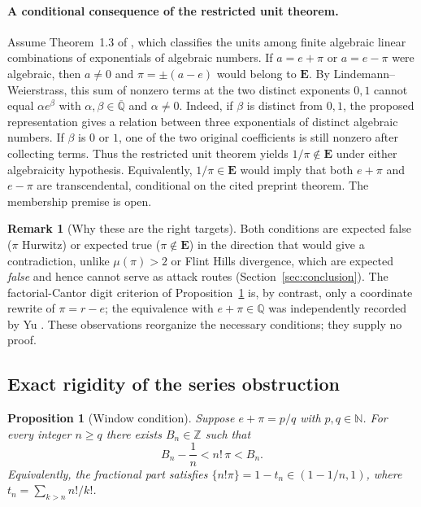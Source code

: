 \documentclass[11pt]{amsart}
\newtheorem{proposition}[theorem]{Proposition}
\theoremstyle{definition}
\newtheorem{remark}[theorem]{Remark}
\theoremstyle{remark}
\numberwithin{equation}{section}
\newcommand{\Q}{\mathbb{Q}}
\newcommand{\Z}{\mathbb{Z}}
\newcommand{\N}{\mathbb{N}}
\newcommand{\Qbar}{\overline{\mathbb{Q}}}
\newcommand{\irr}{\mu}
\begin{document}
\paragraph{A conditional consequence of the restricted unit theorem.}
Assume Theorem~1.3 of \cite{FischlerRivoal2026}, which classifies the
units among finite algebraic linear combinations of exponentials of
algebraic numbers. If $a=e+\pi$ or $a=e-\pi$ were algebraic, then $a\ne0$
and $\pi=\pm(a-e)$ would belong to $\mathbf E$. By
Lindemann--Weierstrass, this sum of nonzero terms at the two distinct
exponents $0,1$ cannot equal $\alpha e^\beta$ with
$\alpha,\beta\in\Qbar$ and $\alpha\ne0$. Indeed, if $\beta$ is distinct
from $0,1$, the proposed representation gives a relation between three
exponentials of distinct algebraic numbers. If $\beta$ is $0$ or $1$,
one of the two original coefficients is still nonzero after collecting
terms. Thus the restricted unit theorem yields $1/\pi\notin\mathbf E$
under either algebraicity hypothesis. Equivalently, $1/\pi\in\mathbf E$
would imply that both $e+\pi$ and $e-\pi$ are transcendental, conditional
on the cited preprint theorem. The membership premise is open.

\begin{remark}[Why these are the right targets]
Both conditions are expected false ($\pi$ Hurwitz) or expected true ($\pi\notin\mathbf{E}$) in the direction that would give a contradiction, unlike $\irr(\pi)>2$ or Flint Hills divergence, which are expected \emph{false} and hence cannot serve as attack routes (Section~\ref{sec:conclusion}). The factorial-Cantor digit criterion of Proposition~\ref{prop:window} is, by contrast, only a coordinate rewrite of $\pi=r-e$; the equivalence with $e+\pi\in\Q$ was independently recorded by Yu \cite{Yu2026}. These observations reorganize the necessary conditions; they supply no proof.
\end{remark}

\subsection{Exact rigidity of the series obstruction}

\begin{proposition}[Window condition]\label{prop:window}
Suppose $e+\pi=p/q$ with $p,q\in\N$. For every integer $n\ge q$ there exists $B_n\in\Z$ such that
\[
B_n-\frac1n<n!\,\pi<B_n.
\]
Equivalently, the fractional part satisfies $\{n!\pi\}=1-t_n\in(1-1/n,1)$, where $t_n=\sum_{k>n}n!/k!$.
\end{proposition}
\end{document}
